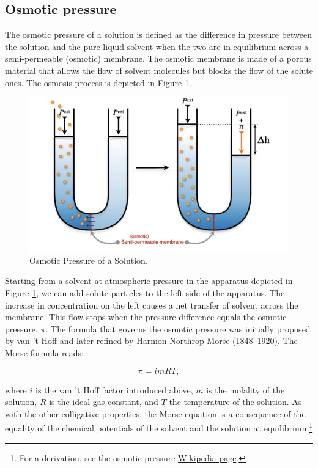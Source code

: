 \documentclass[
  9pt,
]{extbook}
\theoremstyle{definition}
\theoremstyle{definition}
\theoremstyle{definition}
\theoremstyle{definition}
\theoremstyle{remark}
\begin{document}
\subsection{Osmotic pressure}\label{osmotic-pressure}

The osmotic pressure of a solution is defined as the difference in pressure between the solution and the pure liquid solvent when the two are in equilibrium across a semi-permeable (osmotic) membrane. The osmotic membrane is made of a porous material that allows the flow of solvent molecules but blocks the flow of the solute ones. The osmosis process is depicted in Figure \ref{fig:FigSol3}.

\begin{figure}

{\centering \includegraphics[width=0.8\linewidth]{./img/OEP_Figures.035} 

}

\caption{Osmotic Pressure of a Solution.}\label{fig:FigSol3}
\end{figure}

Starting from a solvent at atmospheric pressure in the apparatus depicted in Figure \ref{fig:FigSol3}, we can add solute particles to the left side of the apparatus. The increase in concentration on the left causes a net transfer of solvent across the membrane. This flow stops when the pressure difference equals the osmotic pressure, \(\pi\). The formula that governs the osmotic pressure was initially proposed by van 't Hoff and later refined by Harmon Northrop Morse (1848--1920). The Morse formula reads:

\begin{equation}
\pi = imRT,
\label{eq:coll8}
\end{equation}

where \(i\) is the van 't Hoff factor introduced above, \(m\) is the molality of the solution, \(R\) is the ideal gas constant, and \(T\) the temperature of the solution. As with the other colligative properties, the Morse equation is a consequence of the equality of the chemical potentials of the solvent and the solution at equilibrium.\footnote{For a derivation, see the osmotic pressure \href{https://en.wikipedia.org/wiki/Osmotic_pressure}{Wikipedia page}.}
\end{document}
